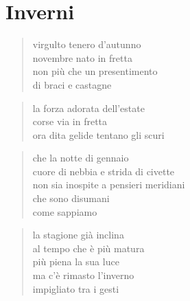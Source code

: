 \chapter*{Inverni}


\begin{verse}
    virgulto tenero d’autunno\\
    novembre nato in fretta\\
    non più che un presentimento\\
    di braci e castagne
\end{verse}

\begin{verse}
    la forza adorata dell’estate\\
    corse via in fretta\\
    ora dita gelide tentano gli scuri
\end{verse}

\clearpage


\begin{verse}
    che la notte di gennaio\\
    cuore di nebbia e strida di civette\\
    non sia inospite a pensieri meridiani\\
    che sono disumani\\
    come sappiamo
\end{verse}

\clearpage


\begin{verse}
    la stagione già inclina\\
    al tempo che è più matura\\
    più piena la sua luce\\
    ma c’è rimasto l’inverno\\
    impigliato tra i gesti
\end{verse}

